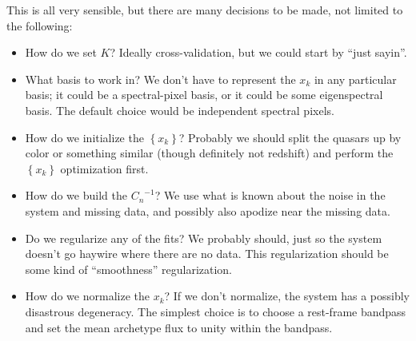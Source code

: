 \documentclass[12pt,letterpaper]{article}
\newcommand{\inverse}[1]{{#1}^{-1}}
\newcommand{\setof}[1]{\left\{{#1}\right\}}
\begin{document}
This is all very sensible, but there are many decisions to be made, not limited to the following:
\begin{itemize}
\item How do we set $K$?
Ideally cross-validation, but we could start by ``just sayin''.
\item What basis to work in?
We don't have to represent the $x_k$ in any particular basis;
it could be a spectral-pixel basis, or it could be some eigenspectral basis.
The default choice would be independent spectral pixels.
\item How do we initialize the $\setof{x_k}$?
Probably we should split the quasars up by color or something similar
(though definitely not redshift) and perform the $\setof{x_k}$ optimization first.
\item How do we build the $\inverse{C_n}$?
We use what is known about the noise in the system and missing data,
and possibly also apodize near the missing data.
\item Do we regularize any of the fits?
We probably should, just so the system doesn't go haywire where there are no data.
This regularization should be some kind of ``smoothness'' regularization.
\item How do we normalize the $x_k$?
If we don't normalize, the system has a possibly disastrous degeneracy.
The simplest choice is to choose a rest-frame bandpass and set
the mean archetype flux to unity within the bandpass.
\end{itemize}
\end{document}
